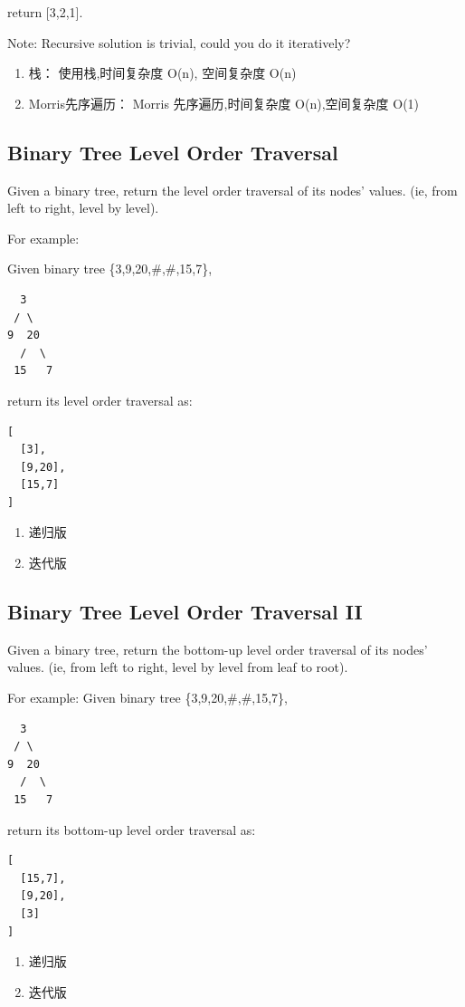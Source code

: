 \documentclass[12pt]{book}
\begin{document}
return [3,2,1].

Note: Recursive solution is trivial, could you do it iteratively?
\begin{enumerate}
\item 栈： 使用栈,时间复杂度 O(n), 空间复杂度 O(n)
\label{sec-4-1-3-1}
\item Morris先序遍历： Morris 先序遍历,时间复杂度 O(n),空间复杂度 O(1)
\label{sec-4-1-3-2}
\end{enumerate}


\subsection{Binary Tree Level Order Traversal}
\label{sec-4-1-4}
Given a binary tree, return the level order traversal of its nodes' values. (ie, from left to right, level by level).

For example:

Given binary tree \{3,9,20,\#,\#,15,7\},
\lstset{language=java,label= ,caption= ,numbers=none}
\begin{lstlisting}
  3
 / \
9  20
  /  \
 15   7
\end{lstlisting}
return its level order traversal as:
\lstset{language=java,label= ,caption= ,numbers=none}
\begin{lstlisting}
[
  [3],
  [9,20],
  [15,7]
]
\end{lstlisting}
\begin{enumerate}
\item 递归版
\label{sec-4-1-4-1}
\item 迭代版
\label{sec-4-1-4-2}
\end{enumerate}

\subsection{Binary Tree Level Order Traversal II}
\label{sec-4-1-5}
Given a binary tree, return the bottom-up level order traversal of its nodes' values. (ie, from left to right, level by level from leaf to root).

For example:
Given binary tree \{3,9,20,\#,\#,15,7\},
\lstset{language=java,label= ,caption= ,numbers=none}
\begin{lstlisting}
  3
 / \
9  20
  /  \
 15   7
\end{lstlisting}
return its bottom-up level order traversal as:
\lstset{language=java,label= ,caption= ,numbers=none}
\begin{lstlisting}
[
  [15,7],
  [9,20],
  [3]
]
\end{lstlisting}
\begin{enumerate}
\item 递归版
\label{sec-4-1-5-1}
\item 迭代版
\label{sec-4-1-5-2}
\end{enumerate}
\end{document}
